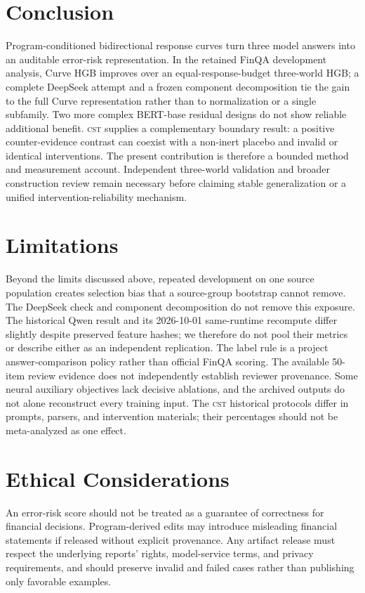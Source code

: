 \documentclass[11pt]{article}
\newcommand{\CST}{\textsc{cst}}
\begin{document}
\section{Conclusion}
Program-conditioned bidirectional response curves turn three model answers into an auditable error-risk representation. In the retained FinQA development analysis, Curve HGB improves over an equal-response-budget three-world HGB; a complete DeepSeek attempt and a frozen component decomposition tie the gain to the full Curve representation rather than to normalization or a single subfamily. Two more complex BERT-base residual designs do not show reliable additional benefit. \CST{} supplies a complementary boundary result: a positive counter-evidence contrast can coexist with a non-inert placebo and invalid or identical interventions. The present contribution is therefore a bounded method and measurement account. Independent three-world validation and broader construction review remain necessary before claiming stable generalization or a unified intervention-reliability mechanism.

\section*{Limitations}
Beyond the limits discussed above, repeated development on one source population creates selection bias that a source-group bootstrap cannot remove. The DeepSeek check and component decomposition do not remove this exposure. The historical Qwen result and its 2026-10-01 same-runtime recompute differ slightly despite preserved feature hashes; we therefore do not pool their metrics or describe either as an independent replication. The label rule is a project answer-comparison policy rather than official FinQA scoring. The available 50-item review evidence does not independently establish reviewer provenance. Some neural auxiliary objectives lack decisive ablations, and the archived outputs do not alone reconstruct every training input. The \CST{} historical protocols differ in prompts, parsers, and intervention materials; their percentages should not be meta-analyzed as one effect.

\section*{Ethical Considerations}
An error-risk score should not be treated as a guarantee of correctness for financial decisions. Program-derived edits may introduce misleading financial statements if released without explicit provenance. Any artifact release must respect the underlying reports' rights, model-service terms, and privacy requirements, and should preserve invalid and failed cases rather than publishing only favorable examples.



\end{document}

